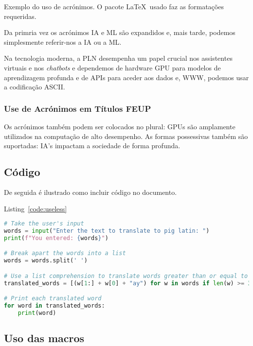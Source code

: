 \begin{info}
Exemplo do uso de acrónimos.  O pacote \LaTeX\ usado faz as formatações requeridas.
\end{info}

Da primria vez os acrónimos \ac{IA} e \ac{ML} são expandidos e, mais tarde, podemos simplesmente referir-nos a \ac{IA} ou a \ac{ML}.

Na tecnologia moderna, a \ac{PLN} desempenha um papel crucial nos assistentes virtuais e nos \emph{chatbots} e dependemos de hardware \ac{GPU} para modelos de aprendizagem profunda e de \acp{API} para aceder aos dados e, \ac{WWW}, podemos usar a codificação \ac{ASCII}.

\subsubsection{Use de Acrónimos em Títulos \acs*{FEUP}}

Os acrónimos também podem ser colocados no plural: \acp{GPU} são amplamente utilizados na computação de alto desempenho.
As formas possessivas também são suportadas: \ac{IA}'s impactam a sociedade de forma profunda.

\lipsum[7]

\subsection*{Código}

\begin{info}
De seguida é ilustrado como incluir código no documento.
\end{info}

Listing~\ref{code:useless} 
\lipsum[8]

\begin{lstlisting}[language=Python, caption=Python example, label=code:useless]
# Take the user's input
words = input("Enter the text to translate to pig latin: ")
print(f"You entered: {words}")

# Break apart the words into a list
words = words.split(' ')

# Use a list comprehension to translate words greater than or equal to 3 characters
translated_words = [(w[1:] + w[0] + "ay") for w in words if len(w) >= 3 ]

# Print each translated word
for word in translated_words:
    print(word)
\end{lstlisting}

\subsection*{Uso das macros}

